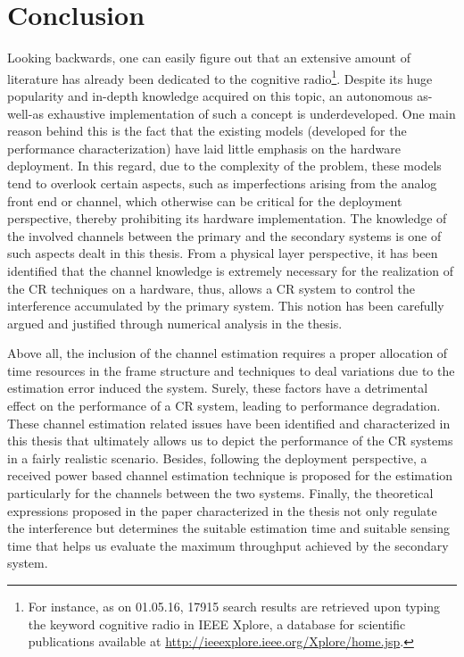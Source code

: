 \chapter{Conclusion}
\label{chap:Con}

Looking backwards, one can easily figure out that an extensive amount of literature has already been dedicated to the cognitive radio\footnote{For instance, as on 01.05.16, 17915 search results are retrieved upon typing the keyword cognitive radio in IEEE Xplore, a database for scientific publications available at \url{http://ieeexplore.ieee.org/Xplore/home.jsp}.}. Despite its huge popularity and in-depth knowledge acquired on this topic, an autonomous as-well-as exhaustive implementation of such a concept is underdeveloped. One main reason behind this is the fact that the existing models (developed for the performance characterization) have laid little emphasis on the hardware deployment. In this regard, due to the complexity of the problem, these models tend to overlook certain aspects, such as imperfections arising from the analog front end or channel, which otherwise can be critical for the deployment perspective, thereby prohibiting its hardware implementation. The knowledge of the involved channels between the primary and the secondary systems is one of such aspects dealt in this thesis. 
From a physical layer perspective, it has been identified that the channel knowledge is extremely necessary for the realization of the CR techniques on a hardware, thus, allows a CR system to control the interference accumulated by the primary system. This notion has been carefully argued and justified through numerical analysis in the thesis. %

Above all, the inclusion of the channel estimation requires a proper allocation of time resources in the frame structure and techniques to deal variations due to the estimation error induced the system. Surely, these factors have a detrimental effect on the performance of a CR system, leading to performance degradation. These channel estimation related issues have been identified and characterized in this thesis that ultimately allows us to depict the performance of the CR systems in a fairly realistic scenario. Besides, following the deployment perspective, a received power based channel estimation technique is proposed for the estimation particularly for the channels between the two systems. Finally, the theoretical expressions proposed in the paper characterized in the thesis not only regulate the interference but determines the suitable estimation time and suitable sensing time that helps us evaluate the maximum throughput achieved by the secondary system. 


